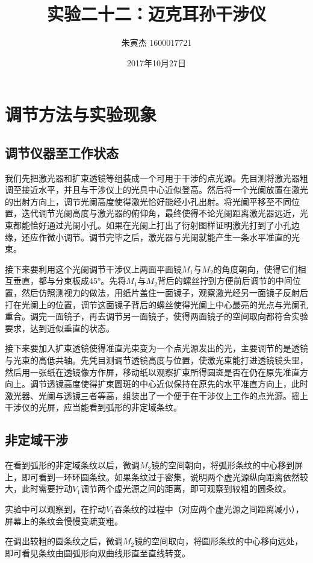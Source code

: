 \documentclass[UTF8]{ctexart}
\title{实验二十二：迈克耳孙干涉仪}
\author{朱寅杰 1600017721}
\date{2017年10月27日}
\begin{document}
\maketitle

\section{调节方法与实验现象}

\subsection{调节仪器至工作状态}
我们先把激光器和扩束透镜等组装成一个可用于干涉的点光源。先目测将激光器粗调至接近水平，并且与干涉仪上的光具中心近似登高。然后将一个光阑放置在激光的出射方向上，调节光阑高度使得激光恰好能经小孔出射。将光阑平移至不同位置，迭代调节光阑高度与激光器的俯仰角，最终使得不论光阑距离激光器远近，光束都能恰好通过光阑小孔。如果在光阑上打出了衍射图样证明激光打到了小孔边缘，还应作微小调节。调节完毕之后，激光器与光阑就能产生一条水平准直的光束。

接下来要利用这个光阑调节干涉仪上两面平面镜$M_1$与$M_2$的角度朝向，使得它们相互垂直，都与分束板成\ang{45}。先将$M_1$与$M_2$背后的螺丝拧到方便前后调节的中间位置，然后仿照测视力的做法，用纸片盖住一面镜子，观察激光经另一面镜子反射后打在光阑上的位置，调节这面镜子背后的螺丝使得光阑上中心最亮的光点与光阑孔重合。调完一面镜子，再去调节另一面镜子，使得两面镜子的空间取向都符合实验要求，达到近似垂直的状态。

接下来要加入扩束透镜使得准直光束变为一个点光源发出的光，主要调节的是透镜与光束的高低共轴。先凭目测调节透镜高度与位置，使激光束能打进透镜镜头里，然后用一张纸在透镜像方作屏，移动纸以观察扩束所得圆斑是否在仍在原先准直方向上。调节透镜高度使得扩束圆斑的中心近似保持在原先的水平准直方向上，此时激光器、光阑与透镜三者等高，组装出了一个便于在干涉仪上工作的点光源。摇上干涉仪的光屏，应当能看到弧形的非定域条纹。
\subsection{非定域干涉}
在看到弧形的非定域条纹以后，微调$M_2$镜的空间朝向，将弧形条纹的中心移到屏上，即可看到一环环圆条纹。如果条纹过于密集，说明两个虚光源纵向距离依然较大，此时需要拧动$V_1$调节两个虚光源之间的距离，即可观察到较粗的圆条纹。

实验中可以观察到，在拧动$V_1$吞条纹的过程中（对应两个虚光源之间距离减小），屏幕上的条纹会慢慢变疏变粗。

在调出较粗的圆条纹之后，微调$M_2$镜的空间取向，将圆形条纹的中心移向远处，即可看见条纹由圆弧形向双曲线形直至直线转变。
\end{document}
